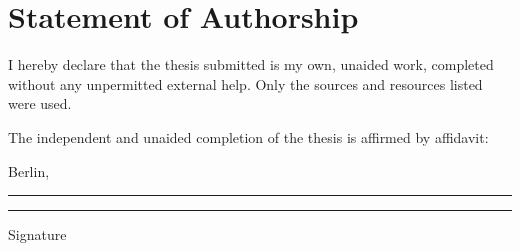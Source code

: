 \chapter*{Statement of Authorship}

I hereby declare that the thesis submitted is my own, unaided work, completed without any
unpermitted external help. Only the sources and resources listed were used.

The independent and unaided completion of the thesis is affirmed by affidavit:

\vspace{3cm}

Berlin, \rule{2cm}{.2pt}\hspace{2cm}\rule{5.5cm}{.2pt}

\hspace{7cm} Signature

\thispagestyle{empty}
